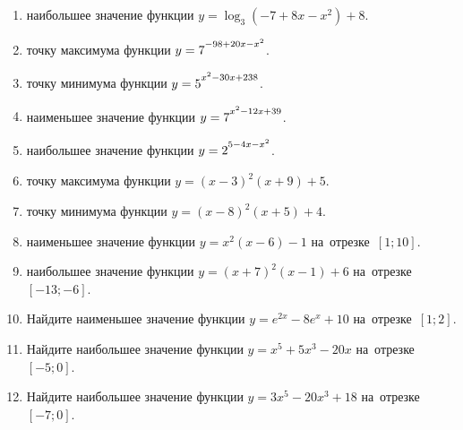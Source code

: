 \documentclass[a4paper,10pt]{article}
\begin{document}
\begin{enumerate}
\item {} наибольшее значение функции $y=\log_3\left(-7+8x-x^2\right)+8$.

\item {} точку максимума функции $y=7\strut^{-98+20x-x^2}$.

\item {} точку минимума функции $y=5\strut^{x^2-30x+238}$.

\item {} наименьшее значение функции $y=7\strut^{x^2-12x+39}$.

\item {} наибольшее значение функции $y=2\strut^{5-4x-x^2}$.

\item {} точку максимума функции $y=\left(x-3\right)^2\left(x+9\right)+5$.

\item {} точку минимума функции $y=\left(x-8\right)^2\left(x+5\right)+4$.

\item {} наименьшее значение функции $y=x^2\left(x-6\right)-1$ на~отрезке~$\left[1;10\right]$.

\item {} наибольшее значение функции $y=\left(x+7\right)^2\left(x-1\right)+6$ на~отрезке~$\left[-13;-6\right]$.

\item Найдите наименьшее значение функции $y=e^{2x}-8e^x+10$ на~отрезке~$\left[1;2\right]$.

\item Найдите наибольшее значение функции $y=x^5+5x^3-20x$ на~отрезке~$\left[-5;0\right]$.

\item Найдите наибольшее значение функции $y=3x^5-20x^3+18$ на~отрезке~$\left[-7;0\right]$.

\end{enumerate}
\end{document}
